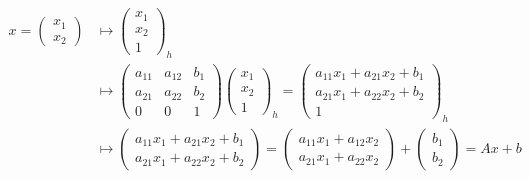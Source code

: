 \begin{align*}
  x =
  \begin{pmatrix}
    x_1 \\
    x_2
  \end{pmatrix}
  &\mapsto
  \begin{pmatrix}
    x_1 \\
    x_2 \\
    1
  \end{pmatrix}_h \\
  &\mapsto
  \begin{pmatrix}
    a_{11} & a_{12} & b_1 \\
    a_{21} & a_{22} & b_2 \\
    0      & 0      & 1
  \end{pmatrix}
  \begin{pmatrix}
    x_1 \\
    x_2 \\
    1
  \end{pmatrix}_h
  =
  \begin{pmatrix}
    a_{11}x_1 + a_{21}x_2 + b_1 \\
    a_{21}x_1 + a_{22}x_2 + b_2 \\
    1
  \end{pmatrix}_h \\
  &\mapsto
  \begin{pmatrix}
    a_{11}x_1 + a_{21}x_2 + b_1 \\
    a_{21}x_1 + a_{22}x_2 + b_2
  \end{pmatrix}
  =
  \begin{pmatrix}
    a_{11}x_1 + a_{12}x_2 \\
    a_{21}x_1 + a_{22}x_2
  \end{pmatrix}
  +
  \begin{pmatrix}
    b_1 \\
    b_2
  \end{pmatrix}
  =
  Ax + b
\end{align*}
